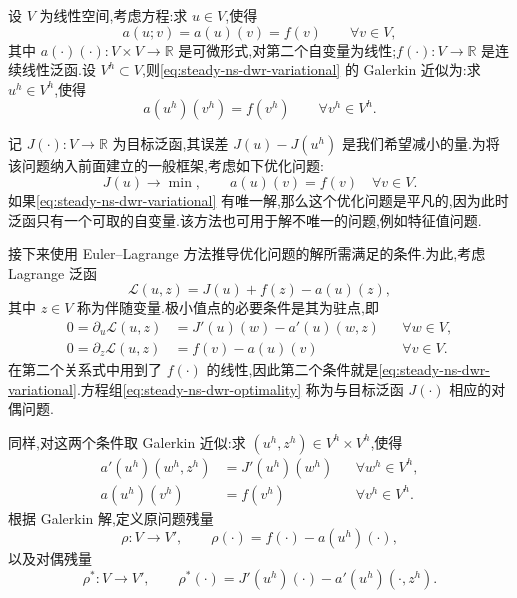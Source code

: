 \begin{note}[基本方法在变分方程中的应用]\label{note:steady-ns-dwr-variational-application}
设 $V$ 为线性空间,考虑方程:求 $u\in V$,使得
\begin{equation}\label{eq:steady-ns-dwr-variational}
  a(u;v)=a(u)(v)=f(v)\qquad \forall v\in V,
\end{equation}
其中 $a(\cdot)(\cdot):V\times V\to\mathbb{R}$ 是可微形式,对第二个自变量为线性;$f(\cdot):V\to\mathbb{R}$ 是连续线性泛函.设 $V^h\subset V$,则\cref{eq:steady-ns-dwr-variational} 的 Galerkin 近似为:求 $u^h\in V^h$,使得
\begin{equation}\label{eq:steady-ns-dwr-variational-galerkin}
  a(u^h)(v^h)=f(v^h)\qquad \forall v^h\in V^h.
\end{equation}

记 $J(\cdot):V\to\mathbb{R}$ 为目标泛函,其误差 $J(u)-J(u^h)$ 是我们希望减小的量.为将该问题纳入前面建立的一般框架,考虑如下优化问题:
\[
  J(u)\longrightarrow\min,
  \qquad a(u)(v)=f(v)\quad \forall v\in V.
\]
如果\cref{eq:steady-ns-dwr-variational} 有唯一解,那么这个优化问题是平凡的,因为此时泛函只有一个可取的自变量.该方法也可用于解不唯一的问题,例如特征值问题.

接下来使用 Euler--Lagrange 方法推导优化问题的解所需满足的条件.为此,考虑 Lagrange 泛函
\[
  \mathcal{L}(u,z)=J(u)+f(z)-a(u)(z),
\]
其中 $z\in V$ 称为伴随变量.极小值点的必要条件是其为驻点,即
\begin{equation}\label{eq:steady-ns-dwr-optimality}
\begin{aligned}
  0=\partial_u\mathcal{L}(u,z)
    &=J'(u)(w)-a'(u)(w,z) &&\forall w\in V,\\
  0=\partial_z\mathcal{L}(u,z)
    &=f(v)-a(u)(v) &&\forall v\in V.
\end{aligned}
\end{equation}
在第二个关系式中用到了 $f(\cdot)$ 的线性,因此第二个条件就是\cref{eq:steady-ns-dwr-variational}.方程组\cref{eq:steady-ns-dwr-optimality} 称为与目标泛函 $J(\cdot)$ 相应的对偶问题.

同样,对这两个条件取 Galerkin 近似:求 $(u^h,z^h)\in V^h\times V^h$,使得
\begin{equation}\label{eq:steady-ns-dwr-optimality-galerkin}
\begin{aligned}
  a'(u^h)(w^h,z^h)&=J'(u^h)(w^h)
    &&\forall w^h\in V^h,\\
  a(u^h)(v^h)&=f(v^h)
    &&\forall v^h\in V^h.
\end{aligned}
\end{equation}
根据 Galerkin 解,定义原问题残量
\begin{equation}\label{eq:steady-ns-dwr-primal-residual}
  \rho:V\to V',\qquad
  \rho(\cdot)=f(\cdot)-a(u^h)(\cdot),
\end{equation}
以及对偶残量
\begin{equation}\label{eq:steady-ns-dwr-dual-residual}
  \rho^*:V\to V',\qquad
  \rho^*(\cdot)=J'(u^h)(\cdot)-a'(u^h)(\cdot,z^h).
\end{equation}
\end{note}

